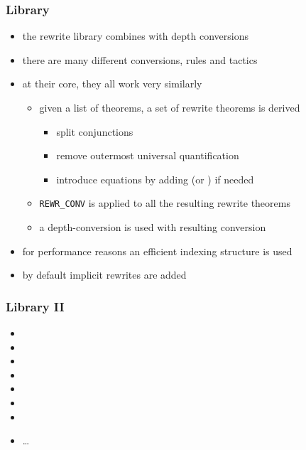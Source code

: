 \begin{frame}
\frametitle{ Library}

\begin{itemize}
\item the rewrite library combines  with depth conversions
\item there are many different conversions, rules and tactics
\item at their core, they all work very similarly
\begin{itemize}
\item given a list of theorems, a set of rewrite theorems is derived
\begin{itemize} 
\item split conjunctions
\item remove outermost universal quantification
\item introduce equations by adding  (or ) if needed
\end{itemize} 
\item \texttt{REWR\_CONV} is applied to all the resulting rewrite theorems
\item a depth-conversion is used with resulting conversion
\end{itemize}
\item for performance reasons an efficient indexing structure is used
\item by default implicit rewrites are added 
\end{itemize}

\end{frame}

\begin{frame}
\frametitle{ Library II}

\begin{itemize}
\item {}
\item {}
\item {}
\item {}
\item {}
\item {}
\item {}
\item \ldots
\end{itemize}
\end{frame}



